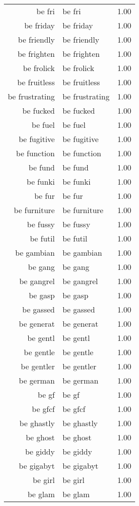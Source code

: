 \begin{table}[ht]
\begin{tabular}{rlr}
  be fri & be fri & 1.00 \\ 
  be friday & be friday & 1.00 \\ 
  be friendly & be friendly & 1.00 \\ 
  be frighten & be frighten & 1.00 \\ 
  be frolick & be frolick & 1.00 \\ 
  be fruitless & be fruitless & 1.00 \\ 
  be frustrating & be frustrating & 1.00 \\ 
  be fucked & be fucked & 1.00 \\ 
  be fuel & be fuel & 1.00 \\ 
  be fugitive & be fugitive & 1.00 \\ 
  be function & be function & 1.00 \\ 
  be fund & be fund & 1.00 \\ 
  be funki & be funki & 1.00 \\ 
  be fur & be fur & 1.00 \\ 
  be furniture & be furniture & 1.00 \\ 
  be fussy & be fussy & 1.00 \\ 
  be futil & be futil & 1.00 \\ 
  be gambian & be gambian & 1.00 \\ 
  be gang & be gang & 1.00 \\ 
  be gangrel & be gangrel & 1.00 \\ 
  be gasp & be gasp & 1.00 \\ 
  be gassed & be gassed & 1.00 \\ 
  be generat & be generat & 1.00 \\ 
  be gentl & be gentl & 1.00 \\ 
  be gentle & be gentle & 1.00 \\ 
  be gentler & be gentler & 1.00 \\ 
  be german & be german & 1.00 \\ 
  be gf & be gf & 1.00 \\ 
  be gfcf & be gfcf & 1.00 \\ 
  be ghastly & be ghastly & 1.00 \\ 
  be ghost & be ghost & 1.00 \\ 
  be giddy & be giddy & 1.00 \\ 
  be gigabyt & be gigabyt & 1.00 \\ 
  be girl & be girl & 1.00 \\ 
  be glam & be glam & 1.00 \\ 

\end{tabular}
\end{table}
